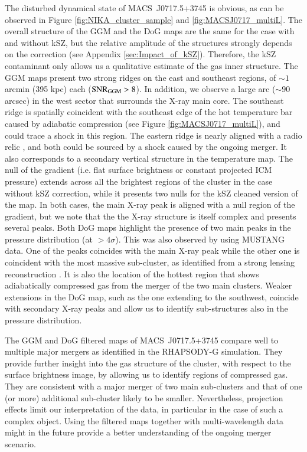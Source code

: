 \documentclass[twocolumn,traditabstract]{aa}
\begin{document}
The disturbed dynamical state of \mbox{MACS~J0717.5+3745} is obvious, as can be observed in Figure \ref{fig:NIKA_cluster_sample} and \ref{fig:MACSJ0717_multiL}. The overall structure of the GGM and the DoG maps are the same for the case with and without kSZ, but the relative amplitude of the structures strongly depends on the correction (see Appendix \ref{sec:Impact_of_kSZ}). Therefore, the kSZ contaminant only allows us a qualitative estimate of the gas inner structure. The GGM maps present two strong ridges on the east and southeast regions, of $\sim 1$ arcmin (395 kpc) each (${\rm SNR}_{\rm GGM} > 8$). In addition, we observe a large arc ($\sim 90$ arcsec) in the west sector that surrounds the X-ray main core. The southeast ridge is spatially coincident with the southeast edge of the hot temperature bar caused by adiabatic compression (see Figure \ref{fig:MACSJ0717_multiL}), and could trace a shock in this region. The eastern ridge is nearly aligned with a radio relic \citep[see, e.g.][]{vanWeeren2017}, and both could be sourced by a shock caused by the ongoing merger. It also corresponds to a secondary vertical structure in the temperature map. The null of the gradient (i.e. flat surface brightness or constant projected ICM pressure) extends across all the brightest regions of the cluster in the case without kSZ correction, while it presents two nulls for the kSZ cleaned version of the map. In both cases, the main X-ray peak is aligned with a null region of the gradient, but we note that the the X-ray structure is itself complex and presents several peaks. Both DoG maps highlight the presence of two main peaks in the pressure distribution (at $> 4 \sigma$). This was also observed by \cite{Mroczkowski2012} using MUSTANG data. One of the peaks coincides with the main X-ray peak while the other one is coincident with the most massive sub-cluster, as identified from a strong lensing reconstruction \citep[e.g.][]{Limousin2015}. It is also the location of the hottest region that shows adiabatically compressed gas from the merger of the two main clusters. Weaker extensions in the DoG map, such as the one extending to the southwest, coincide with secondary X-ray peaks and allow us to identify sub-structures also in the pressure distribution.

The GGM and DoG filtered maps of \mbox{MACS~J0717.5+3745} compare well to multiple major mergers as identified in the RHAPSODY-G simulation. They provide further insight into the gas structure of the cluster, with respect to the surface brightness image, by allowing us to identify regions of compressed gas. They are consistent with a major merger of two main sub-clusters and that of one (or more) additional sub-cluster likely to be smaller. Nevertheless, projection effects limit our interpretation of the data, in particular in the case of such a complex object. Using the filtered maps together with multi-wavelength data might in the future provide a better understanding of the ongoing merger scenario.
\end{document}
